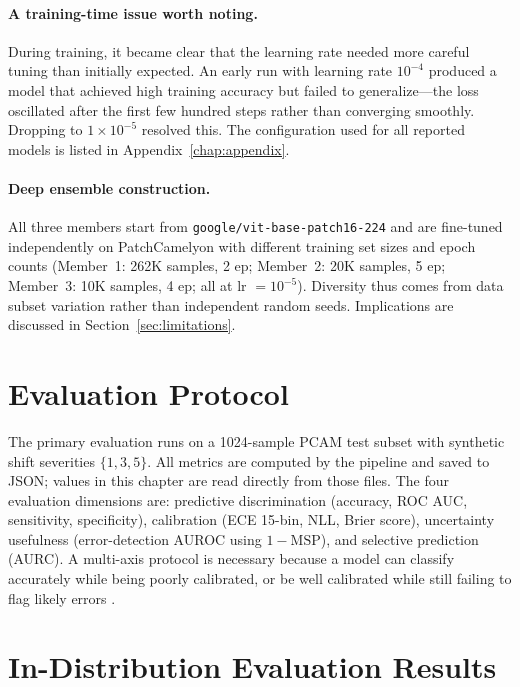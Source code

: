 \paragraph{A training-time issue worth noting.} During training, it became clear that the learning rate needed more careful tuning than initially expected. An early run with learning rate $10^{-4}$ produced a model that achieved high training accuracy but failed to generalize---the loss oscillated after the first few hundred steps rather than converging smoothly. Dropping to $1 \times 10^{-5}$ resolved this. The configuration used for all reported models is listed in Appendix~\ref{chap:appendix}.

\paragraph{Deep ensemble construction.} All three members start from \texttt{google/vit-base-patch16-224} and are fine-tuned independently on PatchCamelyon with different training set sizes and epoch counts (Member~1: 262K samples, 2 ep; Member~2: 20K samples, 5 ep; Member~3: 10K samples, 4 ep; all at lr $= 10^{-5}$). Diversity thus comes from data subset variation rather than independent random seeds. Implications are discussed in Section~\ref{sec:limitations}.

\section{Evaluation Protocol}

The primary evaluation runs on a 1024-sample PCAM test subset with synthetic shift severities $\{1,3,5\}$. All metrics are computed by the pipeline and saved to JSON; values in this chapter are read directly from those files. The four evaluation dimensions are: predictive discrimination (accuracy, ROC AUC, sensitivity, specificity), calibration (ECE 15-bin, NLL, Brier score), uncertainty usefulness (error-detection AUROC using $1-\mathrm{MSP}$), and selective prediction (AURC). A multi-axis protocol is necessary because a model can classify accurately while being poorly calibrated, or be well calibrated while still failing to flag likely errors \cite{linmans2022ood,thagaard2020datasetshift}.

\section{In-Distribution Evaluation Results}

